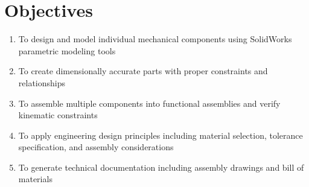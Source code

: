 \section{Objectives}
\begin{enumerate}
	\setlength{\itemsep}{0pt}
	      \setlength{\parskip}{0pt}
	      \setlength{\parsep}{0pt}
	\item To design and model individual mechanical components using SolidWorks parametric modeling tools
	\item To create dimensionally accurate parts with proper constraints and relationships
	\item To assemble multiple components into functional assemblies and verify kinematic constraints
	\item To apply engineering design principles including material selection, tolerance specification, and assembly considerations
	\item To generate technical documentation including assembly drawings and bill of materials
\end{enumerate}

